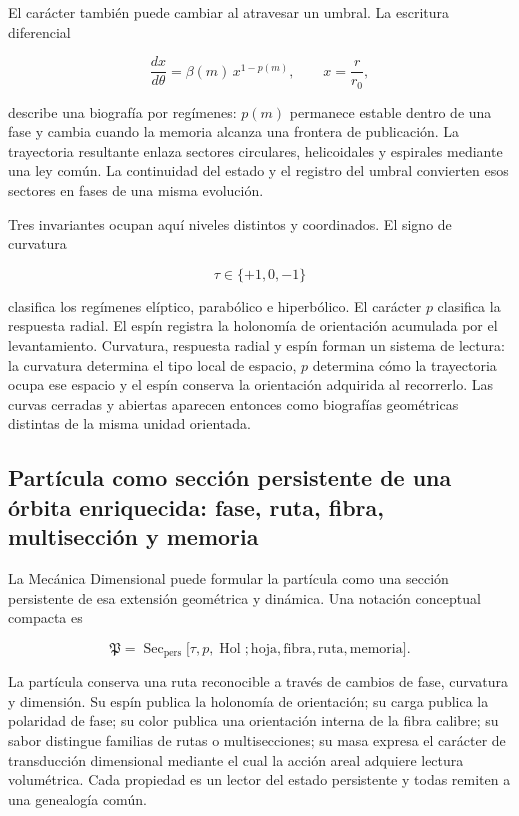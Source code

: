 El carácter también puede cambiar al atravesar un umbral. La escritura diferencial

\[
\frac{dx}{d\theta}
=
\beta(m)\,x^{1-p(m)},
\qquad x=\frac r{r_0},
\]

describe una biografía por regímenes: \(p(m)\) permanece estable dentro de una fase y cambia cuando la memoria alcanza una frontera de publicación. La trayectoria resultante enlaza sectores circulares, helicoidales y espirales mediante una ley común. La continuidad del estado y el registro del umbral convierten esos sectores en fases de una misma evolución.

Tres invariantes ocupan aquí niveles distintos y coordinados. El signo de curvatura

\[
\tau\in\{+1,0,-1\}
\]

clasifica los regímenes elíptico, parabólico e hiperbólico. El carácter \(p\) clasifica la respuesta radial. El espín registra la holonomía de orientación acumulada por el levantamiento. Curvatura, respuesta radial y espín forman un sistema de lectura: la curvatura determina el tipo local de espacio, \(p\) determina cómo la trayectoria ocupa ese espacio y el espín conserva la orientación adquirida al recorrerlo. Las curvas cerradas y abiertas aparecen entonces como biografías geométricas distintas de la misma unidad orientada.

\subsection{Partícula como sección persistente de una órbita enriquecida: fase, ruta, fibra, multisección y memoria}

La Mecánica Dimensional puede formular la partícula como una sección persistente de esa extensión geométrica y dinámica. Una notación conceptual compacta es

\[
\mathfrak P
=
\operatorname{Sec}_{\mathrm{pers}}
\bigl[
\tau,p,\operatorname{Hol};
\text{hoja},\text{fibra},\text{ruta},\text{memoria}
\bigr].
\]

La partícula conserva una ruta reconocible a través de cambios de fase, curvatura y dimensión. Su espín publica la holonomía de orientación; su carga publica la polaridad de fase; su color publica una orientación interna de la fibra calibre; su sabor distingue familias de rutas o multisecciones; su masa expresa el carácter de transducción dimensional mediante el cual la acción areal adquiere lectura volumétrica. Cada propiedad es un lector del estado persistente y todas remiten a una genealogía común.

